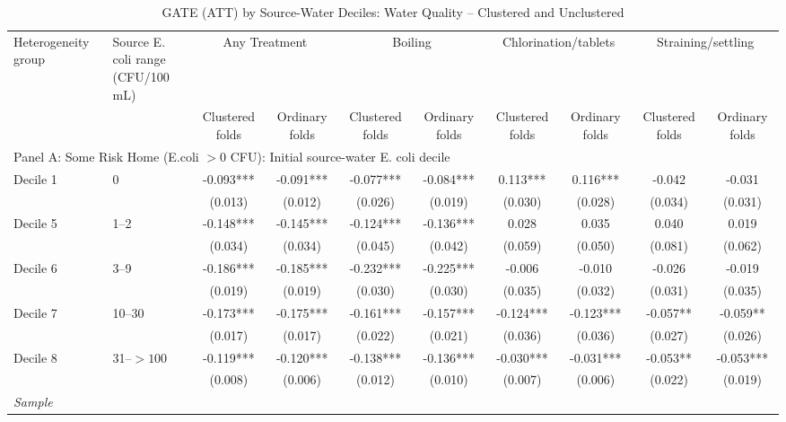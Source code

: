 \begin{landscape}
\begin{table}[p]
\centering
\caption{GATE (ATT) by Source-Water Deciles: Water Quality -- Clustered and Unclustered}
\label{tab:table_gate_appendix_deciles-ecoli}
\scriptsize\setlength{\tabcolsep}{4pt}
\begin{adjustbox}{max width=\linewidth, center}
\begin{tabular}{llcccccccc}
\toprule
Heterogeneity group & \shortstack{Source E. coli range\\(CFU/100 mL)} & \multicolumn{2}{c}{Any Treatment} & \multicolumn{2}{c}{Boiling} & \multicolumn{2}{c}{Chlorination/tablets} & \multicolumn{2}{c}{Straining/settling} \\
 &  & Clustered folds & Ordinary folds & Clustered folds & Ordinary folds & Clustered folds & Ordinary folds & Clustered folds & Ordinary folds \\
\midrule
\multicolumn{10}{l}{Panel A: Some Risk Home (E.coli $>0$ CFU): Initial source-water E. coli decile} \\
Decile 1 & 0 & -0.093*** & -0.091*** & -0.077*** & -0.084*** & 0.113*** & 0.116*** & -0.042 & -0.031 \\
 &  & (0.013) & (0.012) & (0.026) & (0.019) & (0.030) & (0.028) & (0.034) & (0.031) \\
Decile 5 & 1--2 & -0.148*** & -0.145*** & -0.124*** & -0.136*** & 0.028 & 0.035 & 0.040 & 0.019 \\
 &  & (0.034) & (0.034) & (0.045) & (0.042) & (0.059) & (0.050) & (0.081) & (0.062) \\
Decile 6 & 3--9 & -0.186*** & -0.185*** & -0.232*** & -0.225*** & -0.006 & -0.010 & -0.026 & -0.019 \\
 &  & (0.019) & (0.019) & (0.030) & (0.030) & (0.035) & (0.032) & (0.031) & (0.035) \\
Decile 7 & 10--30 & -0.173*** & -0.175*** & -0.161*** & -0.157*** & -0.124*** & -0.123*** & -0.057** & -0.059** \\
 &  & (0.017) & (0.017) & (0.022) & (0.021) & (0.036) & (0.036) & (0.027) & (0.026) \\
Decile 8 & 31--$>100$ & -0.119*** & -0.120*** & -0.138*** & -0.136*** & -0.030*** & -0.031*** & -0.053** & -0.053*** \\
 &  & (0.008) & (0.006) & (0.012) & (0.010) & (0.007) & (0.006) & (0.022) & (0.019) \\
\multicolumn{10}{l}{\textit{Sample}} \\

\end{tabular}
\end{adjustbox}
\end{table}
\end{landscape}
